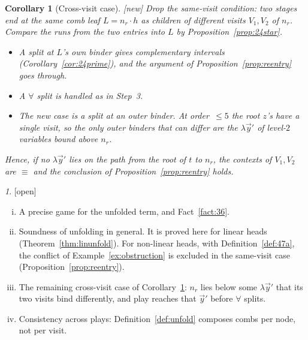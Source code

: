 \documentclass[11pt]{article}
\newcommand{\suc}[2]{#1{\cdot}#2}
\newcommand{\New}{\textsf{[new]}}
\newcommand{\Open}{\textsf{\color{red!60!black}[open]}}
\theoremstyle{plain}
\newtheorem{corollary}[theorem]{Corollary}
\theoremstyle{definition}
\theoremstyle{remark}
\newtheorem*{gapenv}{\gapname}
\newcommand{\gapname}{Gap}
\begin{document}
\begin{corollary}[Cross-visit case]\label{cor:crossvisit}
\New{} Drop the same-visit condition: two stages end at the same comb
leaf $L=\suc{n_r}h$ as children of different visits $V_1,V_2$ of $n_r$.
Compare the runs from the two entries into $L$ by
Proposition~\ref{prop:24star}.
\begin{itemize}
\item A split at $L$'s own binder gives complementary intervals
  (Corollary~\ref{cor:24prime}), and the argument of
  Proposition~\ref{prop:reentry} goes through.
\item A $\forall$ split is handled as in Step~3.
\item The new case is a split at an outer binder.  At order~$\le5$ the
  root $z$'s have a single visit, so the only outer binders that can
  differ are the $\lambda\vec y'$ of level-$2$ variables bound above
  $n_r$.
\end{itemize}
Hence, if no $\lambda\vec y'$ lies on the path from the root of $t$ to
$n_r$, the contexts of $V_1,V_2$ are $\equiv$ and the conclusion of
Proposition~\ref{prop:reentry} holds.
\end{corollary}

\renewcommand{\gapname}{[Gap-Unfolding]}
\begin{gapenv}\label{gap:unfold}
\Open{}
\begin{enumerate}[(i)]
\item A precise game for the unfolded term, and Fact~\ref{fact:36}.
\item Soundness of unfolding in general.  It is proved here for linear
  heads (Theorem~\ref{thm:linunfold}).  For non-linear heads, with
  Definition~\ref{def:47a}, the conflict of
  Example~\ref{ex:obstruction} is excluded in the same-visit case
  (Proposition~\ref{prop:reentry}).
\item The remaining cross-visit case of Corollary~\ref{cor:crossvisit}:
  $n_r$ lies below some $\lambda\vec y'$ that its two visits bind
  differently, and play reaches that $\vec y'$ before $\forall$ splits.
\item Consistency across plays: Definition~\ref{def:unfold} composes
  combs per node, not per visit.
\end{enumerate}
\end{gapenv}
\end{document}
